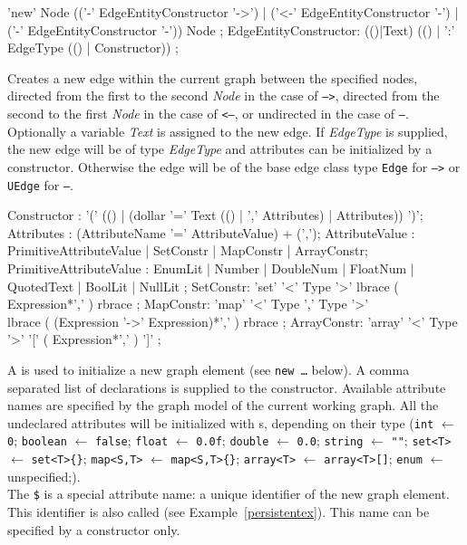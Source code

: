 \begin{rail}
  'new' Node (('-' EdgeEntityConstructor '->') | ('<-' EdgeEntityConstructor '-') | ('-' EdgeEntityConstructor '-')) Node ;
EdgeEntityConstructor:
  (()|Text) (() | ':' EdgeType (() | Constructor)) ;
\end{rail}
Creates a new edge within the current graph between the specified nodes,
directed from the first to the second \emph{Node} in the case of \texttt{-->},
directed from the second to the first \emph{Node} in the case of \texttt{<--},
or undirected in the case of \texttt{--}.
Optionally a variable \emph{Text} is assigned to the new edge.
If \emph{EdgeType} is supplied, the new edge will be of type \emph{EdgeType} and attributes can be initialized by a constructor.
Otherwise the edge will be of the base edge class type \texttt{Edge} for \texttt{-->} or \texttt{UEdge} for \texttt{--}.

\begin{rail}
  Constructor : '(' (() | (dollar '=' Text (() | ',' Attributes) | Attributes)) ')';
  Attributes : (AttributeName '=' AttributeValue) + (',');
  AttributeValue :  PrimitiveAttributeValue | SetConstr | MapConstr | ArrayConstr;
  PrimitiveAttributeValue : EnumLit | Number | DoubleNum | FloatNum | QuotedText | BoolLit | NullLit ;
  SetConstr: 'set' '<' Type '>' lbrace ( Expression*',' ) rbrace ;
  MapConstr: 'map' '<' Type ',' Type '>' \\ lbrace ( (Expression '->' Expression)*',' ) rbrace ;
  ArrayConstr: 'array' '<' Type '>' '[' ( Expression*',' ) ']' ;
\end{rail}\indexmain{\texttt{\$}}
A  is used to initialize a new graph element (see \texttt{new \dots} below).
A comma separated list of  declarations is supplied to the constructor.
Available attribute names are specified by the graph model of the current working graph.
All the undeclared attributes will be initialized with s, depending on their type 
(\texttt{int} $\leftarrow$ \texttt{0}; \texttt{boolean} $\leftarrow$ \texttt{false}; \texttt{float} $\leftarrow$ \texttt{0.0f}; \texttt{double} $\leftarrow$ \texttt{0.0}; \texttt{string} $\leftarrow$ \texttt{""}; \texttt{set<T>} $\leftarrow$ \texttt{set<T>\{\}}; \texttt{map<S,T>} $\leftarrow$ \texttt{map<S,T>\{\}}; \texttt{array<T>} $\leftarrow$ \texttt{array<T>[]}; \texttt{enum} $\leftarrow$ unspecified;).\\
The \texttt{\$} is a special attribute name: a unique identifier of the new graph element.
This identifier is also called  (see Example~\ref{persistentex}).
This name can be specified by a constructor only.

